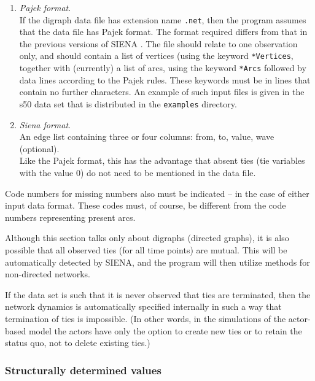 \documentclass[a4paper,fleqn]{article}
\newcommand{\+}{\, + \,}
\newcommand{\SI}{{\sf SIENA }}
\newcommand{\si}{{\sf SIENA}}
\begin{document}
{\begin{enumerate}
      This implies that if the data are already in 0-1 format, the
      single code number 1 must be given. As another example, if the
      data matrix contains values 1 to 5 and only the values 4 and 5 are
      to be interpreted as present arcs, then the code numbers 4 and 5
      must be given.
    \item \emph{Pajek format}.\\
      If the digraph data file has extension name \texttt{.net}, then the
      program assumes that the data file has Pajek format.  The format required
      differs from that in the previous versions of \SI.  The file should relate
      to one observation only, and should contain a list of vertices (using the
      keyword \texttt{*Vertices}, together with (currently) a list of arcs,
      using the keyword \texttt{*Arcs}
      followed by data lines according to the Pajek rules.
      These keywords must be in lines that contain no further characters.
      An example of such input files is given in the s50 data set
      that is distributed in the \texttt{examples} directory.
    \item \emph{Siena format}.\\
      An edge list containing three or four columns:
      from, to, value, wave (optional).\\
      Like the Pajek format, this has the advantage that absent ties
      (tie variables with the value 0) do not need to be mentioned
      in the data file.
\end{enumerate}

Code numbers for missing numbers also must be indicated -- in the case of either
input data format. These
codes must, of course, be different from the code numbers
representing present arcs.

Although this section talks only about digraphs (directed graphs), it is
also possible that all observed ties (for all time points) are mutual.
This will be automatically detected by \si, and
the program will then utilize methods for non-directed networks.

If the data set is such that it is never observed that ties are terminated,
then the network dynamics is automatically specified internally in such a way
that termination of ties is impossible.
(In other words, in the simulations of the actor-based model
the actors have only the option to create new ties or to retain
the status quo, not to delete existing ties.)


\subsubsection{Structurally determined values}
\label{S_struct}

}
\end{document}
